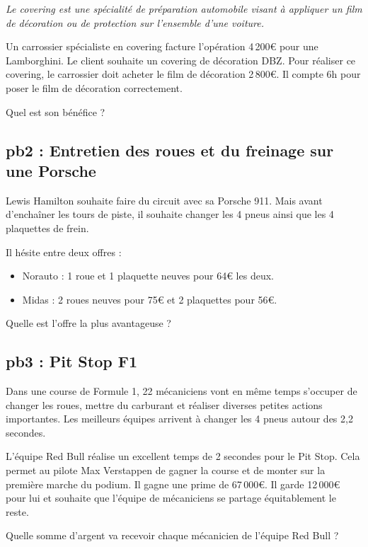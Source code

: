   \textit{Le covering est une spécialité de préparation automobile visant à appliquer un film de décoration ou de protection sur l'ensemble d'une voiture.} 

  Un carrossier spécialiste en covering facture l'opération 4\,200€ pour une Lamborghini. Le client souhaite un covering de décoration DBZ.
  Pour réaliser ce covering, le carrossier doit acheter le film de décoration 2\,800€. Il compte 6h pour poser le film de décoration correctement. 

  Quel est son bénéfice ? 


\subsection*{pb2 : Entretien des roues et du freinage sur une Porsche} 

  Lewis Hamilton souhaite faire du circuit avec sa Porsche 911. Mais avant d'enchaîner les tours de piste, il souhaite changer les 4 pneus ainsi que les 4 plaquettes de frein. 

  Il hésite entre deux offres : 

  \begin{itemize}[label={$\bullet$}]
    \item Norauto : 1 roue et 1 plaquette neuves pour 64€ les deux.
    \item Midas : 2 roues neuves pour 75€ et 2 plaquettes pour 56€. 
  \end{itemize} 

Quelle est l'offre la plus avantageuse ?

\subsection*{pb3 : Pit Stop F1} 

  Dans une course de Formule 1, 22 mécaniciens vont en même temps s'occuper de changer les roues, mettre du carburant et réaliser diverses petites actions importantes. Les meilleurs équipes arrivent à changer les 4 pneus autour des 2,2 secondes. 

  L'équipe Red Bull réalise un excellent temps de 2 secondes pour le Pit Stop. Cela permet au pilote Max Verstappen de gagner la course et de monter sur la première marche du podium. Il gagne une prime de 67\,000€. Il garde 12\,000€ pour lui et souhaite que l'équipe de mécaniciens se partage équitablement le reste. 

Quelle somme d'argent va recevoir chaque mécanicien de l'équipe Red Bull ?

